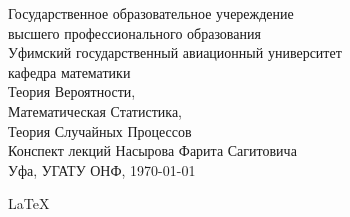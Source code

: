 \begin{titlepage} %
  \pagestyle{empty}
  \begin{center} %
    \large Государственное образовательное учереждение\\
    \large высшего профессионального образования\\
    \large Уфимский государственный авиационный университет\\[0.6cm]
    \large кафедра математики \\[1cm]

    \huge{Теория Вероятности,\\Математическая Статистика,\\Теория Случайных Процессов}\\[4cm] %
    \large Конспект лекций Насырова Фарита Сагитовича\\
    Уфа, УГАТУ ОНФ, {\large \today} %

    \vfill
    {\large \LaTeX} %
  \end{center} %
\end{titlepage} %
